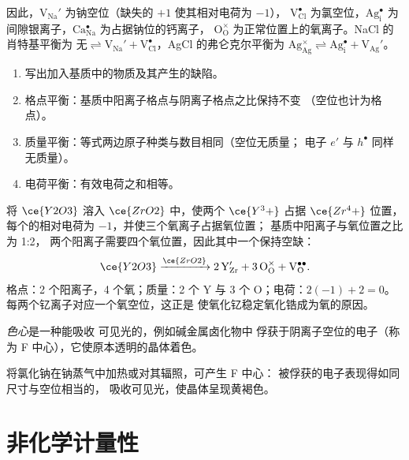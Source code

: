 因此，$\mathrm{V_{Na}'}$ 为钠空位（缺失的 $+1$ 使其相对电荷为 $-1$），
$\mathrm{V_{Cl}^{\bullet}}$ 为氯空位，$\mathrm{Ag_i^{\bullet}}$ 为间隙银离子，$\mathrm{Ca_{Na}^{\bullet}}$ 为占据钠位的钙离子，
$\mathrm{O_O^{\times}}$ 为正常位置上的氧离子。NaCl 的肖特基平衡为
$\text{无} \rightleftharpoons \mathrm{V_{Na}' + V_{Cl}^{\bullet}}$，AgCl 的弗仑克尔平衡为
$\mathrm{Ag_{Ag}^{\times}} \rightleftharpoons \mathrm{Ag_i^{\bullet} + V_{Ag}'}$。

\begin{method}[书写缺陷方程]\label{met:b3:solid-state:kroger-vink}
\begin{enumerate}
  \item 写出加入基质中的物质及其产生的缺陷。
  \item 格点平衡：基质中阳离子格点与阴离子格点之比保持不变
        （空位也计为格点）。
  \item 质量平衡：等式两边原子种类与数目相同（空位无质量；
        电子 $e'$ 与 $h^\bullet$ 同样无质量）。
  \item 电荷平衡：有效电荷之和相等。
\end{enumerate}
\end{method}

\begin{example}[氧化钇在氧化锆中]
将 $\ce{Y2O3}$ 溶入 $\ce{ZrO2}$ 中，使两个 $\ce{Y^3+}$ 占据 $\ce{Zr^4+}$ 位置，每个的相对电荷为 $-1$，并使三个氧离子占据氧位置；
基质中阳离子与氧位置之比为 1:2，
两个阳离子需要四个氧位置，因此其中一个保持空缺：
\[
  \ce{Y2O3} \xrightarrow{\ce{ZrO2}} \mathrm{2\,Y_{Zr}' + 3\,O_O^{\times} + V_O^{\bullet\bullet}}.
\]
格点：2 个阳离子，4 个氧；质量：2 个 Y 与 3 个 O；电荷：$2(-1) + 2 = 0$。
每两个钇离子对应一个氧空位，这正是
使氧化钇稳定氧化锆成为氧的原因。
\end{example}

\begin{definition}[色心]\label{def:b3:solid-state:colour-centre}
\emph{色心}是一种能吸收
可见光的，例如碱金属卤化物中
俘获于阴离子空位的电子（称为 F 中心），它使原本透明的晶体着色。
\end{definition}

将氯化钠在钠蒸气中加热或对其辐照，可产生 F 中心：
被俘获的电子表现得如同尺寸与空位相当的，
吸收可见光，使晶体呈现黄褐色。

\section{非化学计量性}

